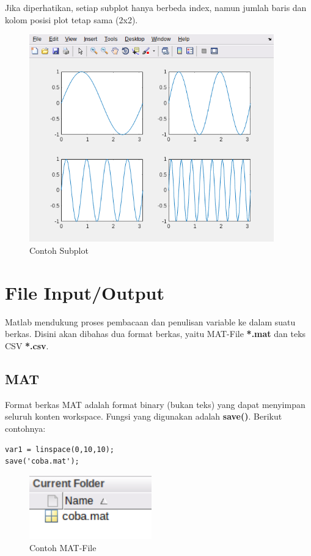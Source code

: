 \documentclass[12pt]{book}
\begin{document}
	Jika diperhatikan, setiap subplot hanya berbeda index, namun jumlah baris dan kolom posisi plot tetap sama (2x2).

	\begin{figure}[!ht]
		\centering
		\includegraphics[width=300pt]{images/subplot}
		\caption{Contoh Subplot}
	\end{figure}

	\section{File Input/Output}

	Matlab mendukung proses pembacaan dan penulisan variable ke dalam suatu berkas.
	Disini akan dibahas dua format berkas, yaitu MAT-File \textbf{*.mat} dan teks CSV \textbf{*.csv}.

	\subsection{MAT}

	Format berkas MAT adalah format binary (bukan teks) yang dapat menyimpan seluruh konten workspace.
	Fungsi yang digunakan adalah \textbf{save()}.
	Berikut contohnya:

	\begin{verbatim}
var1 = linspace(0,10,10);
save('coba.mat');
	\end{verbatim}

	\begin{figure}[!ht]
		\centering
		\includegraphics[width=150pt]{images/matfile}
		\caption{Contoh MAT-File}
	\end{figure}
\end{document}
